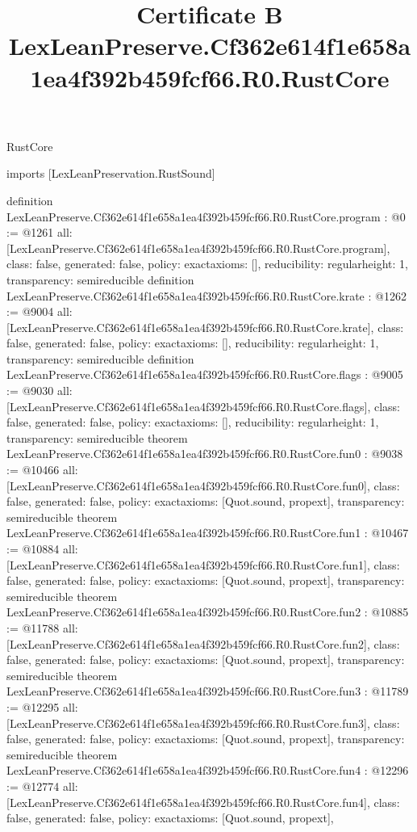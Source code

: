 \begin{lexlean}{RustCore}
\title{Certificate B LexLeanPreserve.Cf362e614f1e658a1ea4f392b459fcf66.R0.RustCore}
\begin{coremodule}
imports [LexLeanPreservation.RustSound]

definition LexLeanPreserve.Cf362e614f1e658a1ea4f392b459fcf66.R0.RustCore.program : @0 := @1261 {
  all: [LexLeanPreserve.Cf362e614f1e658a1ea4f392b459fcf66.R0.RustCore.program],
  class: false,
  generated: false,
  policy: exact{axioms: []},
  reducibility: regular{height: 1},
  transparency: semireducible
}
definition LexLeanPreserve.Cf362e614f1e658a1ea4f392b459fcf66.R0.RustCore.krate : @1262 := @9004 {
  all: [LexLeanPreserve.Cf362e614f1e658a1ea4f392b459fcf66.R0.RustCore.krate],
  class: false,
  generated: false,
  policy: exact{axioms: []},
  reducibility: regular{height: 1},
  transparency: semireducible
}
definition LexLeanPreserve.Cf362e614f1e658a1ea4f392b459fcf66.R0.RustCore.flags : @9005 := @9030 {
  all: [LexLeanPreserve.Cf362e614f1e658a1ea4f392b459fcf66.R0.RustCore.flags],
  class: false,
  generated: false,
  policy: exact{axioms: []},
  reducibility: regular{height: 1},
  transparency: semireducible
}
theorem LexLeanPreserve.Cf362e614f1e658a1ea4f392b459fcf66.R0.RustCore.fun0 : @9038 := @10466 {
  all: [LexLeanPreserve.Cf362e614f1e658a1ea4f392b459fcf66.R0.RustCore.fun0],
  class: false,
  generated: false,
  policy: exact{axioms: [Quot.sound, propext]},
  transparency: semireducible
}
theorem LexLeanPreserve.Cf362e614f1e658a1ea4f392b459fcf66.R0.RustCore.fun1 : @10467 := @10884 {
  all: [LexLeanPreserve.Cf362e614f1e658a1ea4f392b459fcf66.R0.RustCore.fun1],
  class: false,
  generated: false,
  policy: exact{axioms: [Quot.sound, propext]},
  transparency: semireducible
}
theorem LexLeanPreserve.Cf362e614f1e658a1ea4f392b459fcf66.R0.RustCore.fun2 : @10885 := @11788 {
  all: [LexLeanPreserve.Cf362e614f1e658a1ea4f392b459fcf66.R0.RustCore.fun2],
  class: false,
  generated: false,
  policy: exact{axioms: [Quot.sound, propext]},
  transparency: semireducible
}
theorem LexLeanPreserve.Cf362e614f1e658a1ea4f392b459fcf66.R0.RustCore.fun3 : @11789 := @12295 {
  all: [LexLeanPreserve.Cf362e614f1e658a1ea4f392b459fcf66.R0.RustCore.fun3],
  class: false,
  generated: false,
  policy: exact{axioms: [Quot.sound, propext]},
  transparency: semireducible
}
theorem LexLeanPreserve.Cf362e614f1e658a1ea4f392b459fcf66.R0.RustCore.fun4 : @12296 := @12774 {
  all: [LexLeanPreserve.Cf362e614f1e658a1ea4f392b459fcf66.R0.RustCore.fun4],
  class: false,
  generated: false,
  policy: exact{axioms: [Quot.sound, propext]},
}
\end{coremodule}
\end{lexlean}
